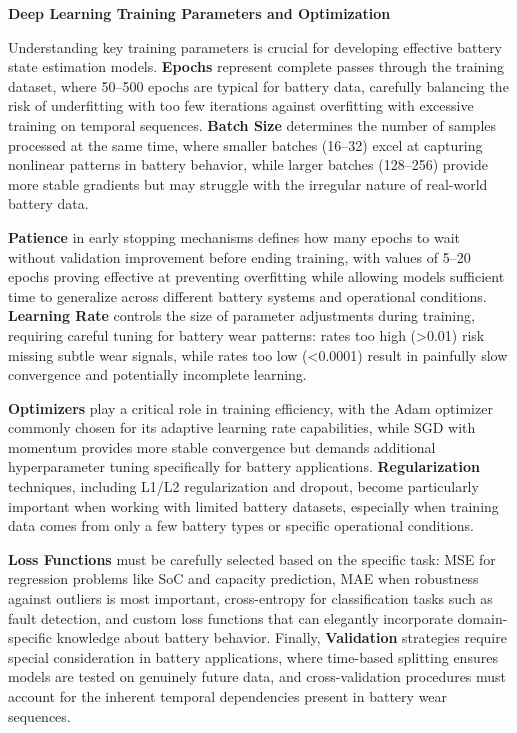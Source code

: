 \vspace{1cm}

\textbf{Deep Learning Training Parameters and Optimization}

Understanding key training parameters is crucial for developing effective battery state estimation models. \textbf{Epochs} represent complete passes through the training dataset, where 50--500 epochs are typical for battery data, carefully balancing the risk of underfitting with too few iterations against overfitting with excessive training on temporal sequences. \textbf{Batch Size} determines the number of samples processed at the same time, where smaller batches (16--32) excel at capturing nonlinear patterns in battery behavior, while larger batches (128--256) provide more stable gradients but may struggle with the irregular nature of real-world battery data.

\textbf{Patience} in early stopping mechanisms defines how many epochs to wait without validation improvement before ending training, with values of 5--20 epochs proving effective at preventing overfitting while allowing models sufficient time to generalize across different battery systems and operational conditions. \textbf{Learning Rate} controls the size of parameter adjustments during training, requiring careful tuning for battery wear patterns: rates too high (>0.01) risk missing subtle wear signals, while rates too low (<0.0001) result in painfully slow convergence and potentially incomplete learning.

\textbf{Optimizers} play a critical role in training efficiency, with the Adam optimizer commonly chosen for its adaptive learning rate capabilities, while SGD with momentum provides more stable convergence but demands additional hyperparameter tuning specifically for battery applications. \textbf{Regularization} techniques, including L1/L2 regularization and dropout, become particularly important when working with limited battery datasets, especially when training data comes from only a few battery types or specific operational conditions.

\textbf{Loss Functions} must be carefully selected based on the specific task: MSE for regression problems like SoC and capacity prediction, MAE when robustness against outliers is most important, cross-entropy for classification tasks such as fault detection, and custom loss functions that can elegantly incorporate domain-specific knowledge about battery behavior. Finally, \textbf{Validation} strategies require special consideration in battery applications, where time-based splitting ensures models are tested on genuinely future data, and cross-validation procedures must account for the inherent temporal dependencies present in battery wear sequences.


